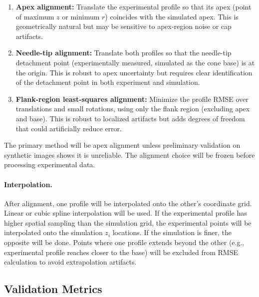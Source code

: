 \begin{enumerate}
    \item \textbf{Apex alignment:} Translate the experimental profile so that its apex (point of maximum $z$ or minimum $r$) coincides with the simulated apex. This is geometrically natural but may be sensitive to apex-region noise or cap artifacts.
    \item \textbf{Needle-tip alignment:} Translate both profiles so that the needle-tip detachment point (experimentally measured, simulated as the cone base) is at the origin. This is robust to apex uncertainty but requires clear identification of the detachment point in both experiment and simulation.
    \item \textbf{Flank-region least-squares alignment:} Minimize the profile RMSE over translations and small rotations, using only the flank region (excluding apex and base). This is robust to localized artifacts but adds degrees of freedom that could artificially reduce error.
\end{enumerate}

The primary method will be apex alignment unless preliminary validation on synthetic images shows it is unreliable. The alignment choice will be frozen before processing experimental data.

\paragraph{Interpolation.} After alignment, one profile will be interpolated onto the other's coordinate grid. Linear or cubic spline interpolation will be used. If the experimental profile has higher spatial sampling than the simulation grid, the experimental points will be interpolated onto the simulation $z_i$ locations. If the simulation is finer, the opposite will be done. Points where one profile extends beyond the other (e.g., experimental profile reaches closer to the base) will be excluded from RMSE calculation to avoid extrapolation artifacts.

\subsection{Validation Metrics}

